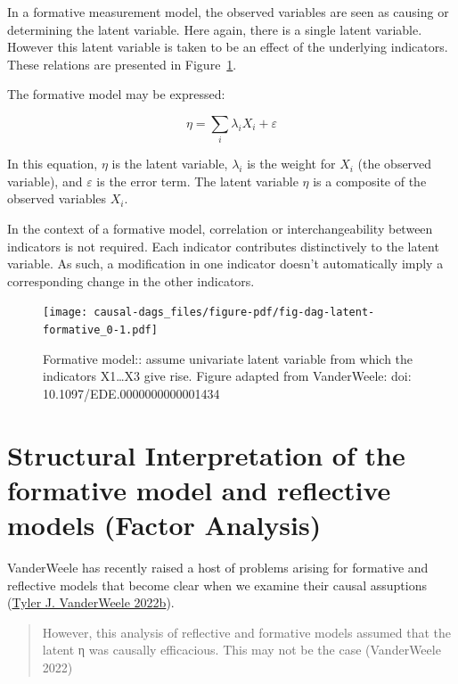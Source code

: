\documentclass[
  singlecolumn]{report}
\begin{document}
In a formative measurement model, the observed variables are seen as
causing or determining the latent variable. Here again, there is a
single latent variable. However this latent variable is taken to be an
effect of the underlying indicators. These relations are presented in
Figure~\ref{fig-dag-latent-formative_0}.

The formative model may be expressed:

\[\eta = \sum_i\lambda_i X_i + \varepsilon\]

In this equation, \(\eta\) is the latent variable, \(\lambda_i\) is the
weight for \(X_i\) (the observed variable), and \(\varepsilon\) is the
error term. The latent variable \(\eta\) is a composite of the observed
variables \(X_i\).

In the context of a formative model, correlation or interchangeability
between indicators is not required. Each indicator contributes
distinctively to the latent variable. As such, a modification in one
indicator doesn't automatically imply a corresponding change in the
other indicators.

\begin{figure}

{\centering \texttt{[image: causal-dags\_files/figure-pdf/fig-dag-latent-formative\_0-1.pdf]}

}

\caption{\label{fig-dag-latent-formative_0}Formative model:: assume
univariate latent variable from which the indicators X1\ldots X3 give
rise. Figure adapted from VanderWeele: doi:
10.1097/EDE.0000000000001434}

\end{figure}

\hypertarget{structural-interpretation-of-the-formative-model-and-reflective-models-factor-analysis}{%
\section{Structural Interpretation of the formative model and reflective
models (Factor
Analysis)}\label{structural-interpretation-of-the-formative-model-and-reflective-models-factor-analysis}}

VanderWeele has recently raised a host of problems arising for formative
and reflective models that become clear when we examine their causal
assuptions (\protect\hyperlink{ref-vanderweele2022}{Tyler J. VanderWeele
2022b}).

\begin{quote}
However, this analysis of reflective and formative models assumed that
the latent η was causally efficacious. This may not be the case
(VanderWeele 2022)
\end{quote}
\end{document}
